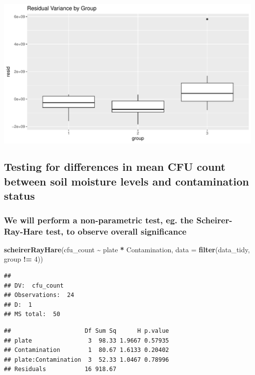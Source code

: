 \documentclass[
]{article}
\newenvironment{Shaded}{\begin{snugshade}}{\end{snugshade}}
\newcommand{\AttributeTok}[1]{\textcolor[rgb]{0.13,0.29,0.53}{#1}}
\newcommand{\DecValTok}[1]{\textcolor[rgb]{0.00,0.00,0.81}{#1}}
\newcommand{\FunctionTok}[1]{\textcolor[rgb]{0.13,0.29,0.53}{\textbf{#1}}}
\newcommand{\NormalTok}[1]{#1}
\newcommand{\SpecialCharTok}[1]{\textcolor[rgb]{0.81,0.36,0.00}{\textbf{#1}}}
\begin{document}
\includegraphics{analysis_files/figure-latex/a-1.pdf}

\subsection{Testing for differences in mean CFU count between soil
moisture levels and contamination
status}\label{testing-for-differences-in-mean-cfu-count-between-soil-moisture-levels-and-contamination-status}

\subsubsection{We will perform a non-parametric test, eg. the
Scheirer-Ray-Hare test, to observe overall
significance}\label{we-will-perform-a-non-parametric-test-eg.-the-scheirer-ray-hare-test-to-observe-overall-significance}

\begin{Shaded}
\begin{Highlighting}[]
\FunctionTok{scheirerRayHare}\NormalTok{(cfu\_count }\SpecialCharTok{\textasciitilde{}}\NormalTok{ plate }\SpecialCharTok{*}\NormalTok{ Contamination, }\AttributeTok{data =} \FunctionTok{filter}\NormalTok{(data\_tidy, group }\SpecialCharTok{!=} \DecValTok{4}\NormalTok{))}
\end{Highlighting}
\end{Shaded}

\begin{verbatim}
## 
## DV:  cfu_count 
## Observations:  24 
## D:  1 
## MS total:  50
\end{verbatim}

\begin{verbatim}
##                     Df Sum Sq      H p.value
## plate                3  98.33 1.9667 0.57935
## Contamination        1  80.67 1.6133 0.20402
## plate:Contamination  3  52.33 1.0467 0.78996
## Residuals           16 918.67
\end{verbatim}
\end{document}
